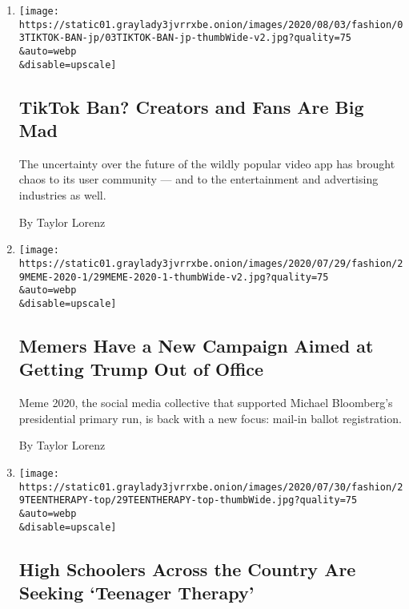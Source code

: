 \begin{enumerate}
\def\labelenumi{\arabic{enumi}.}
\item
  \href{/2020/08/02/style/tiktok-ban-threat-trump.html}{}

  \texttt{[image: https://static01.graylady3jvrrxbe.onion/images/2020/08/03/fashion/03TIKTOK-BAN-jp/03TIKTOK-BAN-jp-thumbWide-v2.jpg?quality=75\\\&auto=webp\\\&disable=upscale]}

  \hypertarget{tiktok-ban-creators-and-fans-are-big-mad}{%
  \subsection{TikTok Ban? Creators and Fans Are Big
  Mad}\label{tiktok-ban-creators-and-fans-are-big-mad}}

  The uncertainty over the future of the wildly popular video app has
  brought chaos to its user community --- and to the entertainment and
  advertising industries as well.

  By Taylor Lorenz
\item
  \href{/2020/07/29/style/meme-2020-lincoln-project-election.html}{}

  \texttt{[image: https://static01.graylady3jvrrxbe.onion/images/2020/07/29/fashion/29MEME-2020-1/29MEME-2020-1-thumbWide-v2.jpg?quality=75\\\&auto=webp\\\&disable=upscale]}

  \hypertarget{memers-have-a-new-campaign-aimed-at-getting-trump-out-of-office}{%
  \subsection{Memers Have a New Campaign Aimed at Getting Trump Out of
  Office}\label{memers-have-a-new-campaign-aimed-at-getting-trump-out-of-office}}

  Meme 2020, the social media collective that supported Michael
  Bloomberg's presidential primary run, is back with a new focus:
  mail-in ballot registration.

  By Taylor Lorenz
\item
  \href{/2020/07/29/style/teenager-therapy-podcast.html}{}

  \texttt{[image: https://static01.graylady3jvrrxbe.onion/images/2020/07/30/fashion/29TEENTHERAPY-top/29TEENTHERAPY-top-thumbWide.jpg?quality=75\\\&auto=webp\\\&disable=upscale]}

  \hypertarget{high-schoolers-across-the-country-are-seeking-teenager-therapy}{%
  \subsection{High Schoolers Across the Country Are Seeking `Teenager
  Therapy'}\label{high-schoolers-across-the-country-are-seeking-teenager-therapy}}


\end{enumerate}
